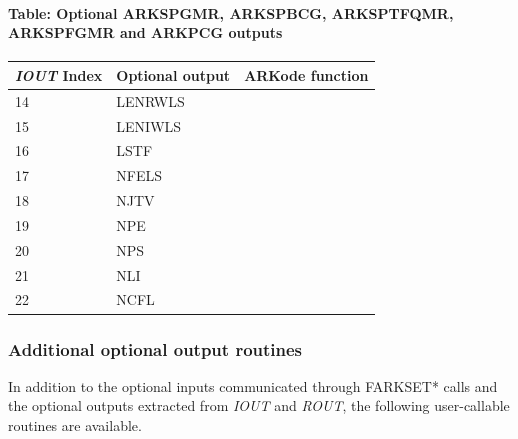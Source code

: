 \documentclass[letterpaper,10pt,english]{sphinxmanual}
\begin{document}
\paragraph{Table: Optional ARKSPGMR, ARKSPBCG, ARKSPTFQMR, ARKSPFGMR and ARKPCG outputs}
\label{f_interface/Optional_output:table-optional-arkspgmr-arkspbcg-arksptfqmr-arkspfgmr-and-arkpcg-outputs}\label{f_interface/Optional_output:finterface-spilsiouttable}
\begin{tabulary}{\linewidth}{|L|L|L|}
\hline
\textbf{
\emph{IOUT} Index
} & \textbf{
Optional output
} & \textbf{
ARKode function
}\\\hline

14
 & 
LENRWLS
 & 
{\hyperref[c_interface/User_callable:ARKSpilsGetWorkSpace]{}}
\\\hline

15
 & 
LENIWLS
 & 
{\hyperref[c_interface/User_callable:ARKSpilsGetWorkSpace]{}}
\\\hline

16
 & 
LSTF
 & 
{\hyperref[c_interface/User_callable:ARKSpilsGetLastFlag]{}}
\\\hline

17
 & 
NFELS
 & 
{\hyperref[c_interface/User_callable:ARKSpilsGetNumRhsEvals]{}}
\\\hline

18
 & 
NJTV
 & 
{\hyperref[c_interface/User_callable:ARKSpilsGetNumJtimesEvals]{}}
\\\hline

19
 & 
NPE
 & 
{\hyperref[c_interface/User_callable:ARKSpilsGetNumPrecEvals]{}}
\\\hline

20
 & 
NPS
 & 
{\hyperref[c_interface/User_callable:ARKSpilsGetNumPrecSolves]{}}
\\\hline

21
 & 
NLI
 & 
{\hyperref[c_interface/User_callable:ARKSpilsGetNumLinIters]{}}
\\\hline

22
 & 
NCFL
 & 
{\hyperref[c_interface/User_callable:ARKSpilsGetNumConvFails]{}}
\\\hline
\end{tabulary}



\subsubsection{Additional optional output routines}
\label{f_interface/Optional_output:additional-optional-output-routines}
In addition to the optional inputs communicated through FARKSET*
calls and the optional outputs extracted from \emph{IOUT} and \emph{ROUT},
the following user-callable routines are available.
\end{document}

